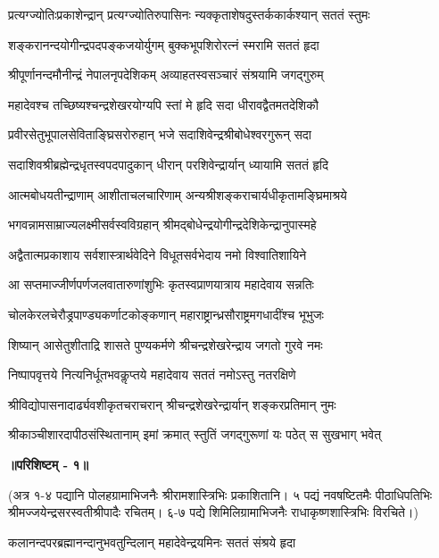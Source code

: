 \twolineshloka
{प्रत्यग्ज्योतिःप्रकाशेन्द्रान् प्रत्यग्ज्योतिरुपासिनः}
{न्यक्कृताशेषदुस्तर्ककार्कश्यान् सततं स्तुमः}%

\twolineshloka
{शङ्करानन्दयोगीन्द्रपदपङ्कजयोर्युगम्}
{बुक्कभूपशिरोरत्नं स्मरामि सततं हृदा}%

\twolineshloka
{श्रीपूर्णानन्दमौनीन्द्रं नेपालनृपदेशिकम्}
{अव्याहतस्वसञ्चारं संश्रयामि जगद्गुरुम्}%

\twolineshloka
{महादेवश्च तच्छिष्यश्चन्द्रशेखरयोग्यपि}
{स्तां मे हृदि सदा धीरावद्वैतमतदेशिकौ}%

\twolineshloka
{प्रवीरसेतुभूपालसेविताङ्घ्रिसरोरुहान्}
{भजे सदाशिवेन्द्रश्रीबोधेश्वरगुरून् सदा}%

\twolineshloka
{सदाशिवश्रीब्रह्मेन्द्रधृतस्वपदपादुकान्}
{धीरान् परशिवेन्द्रार्यान् ध्यायामि सततं हृदि}%

\twolineshloka
{आत्मबोधयतीन्द्राणाम् आशीताचलचारिणाम्}
{अन्यश्रीशङ्कराचार्यधीकृतामङ्घ्रिमाश्रये}%

\twolineshloka
{भगवन्नामसाम्राज्यलक्ष्मीसर्वस्वविग्रहान्}
{श्रीमद्बोधेन्द्रयोगीन्द्रदेशिकेन्द्रानुपास्महे}%

\twolineshloka
{अद्वैतात्मप्रकाशाय सर्वशास्त्रार्थवेदिने}
{विधूतसर्वभेदाय नमो विश्वातिशायिने}%

\twolineshloka
{आ सप्तमाज्जीर्णपर्णजलवातारुणांशुभिः}
{कृतस्वप्राणयात्राय महादेवाय सन्नतिः}%

\twolineshloka
{चोलकेरलचेरौड्रपाण्ड्यकर्णाटकोङ्कणान्}
{महाराष्ट्रान्ध्रसौराष्ट्रमगधादींश्च भूभुजः}%

\twolineshloka
{शिष्यान् आसेतुशीताद्रि शासते पुण्यकर्मणे}
{श्रीचन्द्रशेखरेन्द्राय जगतो गुरवे नमः}%

\twolineshloka
{निष्पापवृत्तये नित्यनिर्धूतभवकॢप्तये}
{महादेवाय सततं नमोऽस्तु नतरक्षिणे}%

\twolineshloka
{श्रीविद्योपासनादार्ढ्यवशीकृतचराचरान्}
{श्रीचन्द्रशेखरेन्द्रार्यान् शङ्करप्रतिमान् नुमः}%

\twolineshloka
{श्रीकाञ्चीशारदापीठसंस्थितानाम् इमां क्रमात्}
{स्तुतिं जगद्गुरूणां यः पठेत् स सुखभाग् भवेत्}%

\medskip

\textbf{॥परिशिष्टम् - १॥}

(अत्र १-४ पद्यानि पोलहग्रामाभिजनैः श्रीरामशास्त्रिभिः प्रकाशितानि। ५ पद्यं नवषष्टितमैः पीठाधिपतिभिः श्रीमज्जयेन्द्रसरस्वतीश्रीपादैः रचितम्। ६-७ पद्ये शिमिलिग्रामाभिजनैः राधाकृष्णशास्त्रिभिः विरचिते।)


\twolineshloka
{कलानन्दपरब्रह्मानन्दानुभवतुन्दिलान्}
{महादेवेन्द्रयमिनः सततं संश्रये हृदा}%

